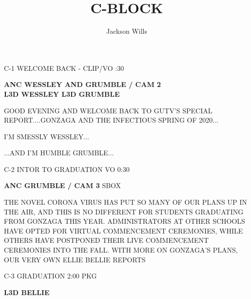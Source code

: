 \documentclass{article}
\title{C-BLOCK}
\author{Jackson Wills}
\newenvironment{changemargin}[2]{%
\begin{list}{}{%
\setlength{\topsep}{0pt}%
\setlength{\leftmargin}{#1}%
\setlength{\rightmargin}{#2}%
\setlength{\listparindent}{\parindent}%
\setlength{\itemindent}{\parindent}%
\setlength{\parsep}{\parskip}%
}%
\item[]}{\end{list}}
\begin{document}
\maketitle
\begin{flushleft}
\begin{changemargin}{-3cm}{-5cm}
\color{red}
C-1     WELCOME BACK - CLIP/VO  :30
\vspace{5mm}

\color{black}
\textbf{
ANC WESSLEY AND GRUMBLE / CAM 2} \\

\textbf{
L3D WESSLEY L3D GRUMBLE
}
\end{changemargin}

\begin{changemargin}{4cm}{1cm}
GOOD EVENING AND WELCOME BACK TO GUTV'S SPECIAL REPORT....GONZAGA AND THE INFECTIOUS SPRING OF 2020...

\vspace{5mm}

I'M SMESSLY WESSLEY...

\vspace{5mm}

...AND I'M HUMBLE GRUMBLE...
\end{changemargin}




\begin{changemargin}{-3cm}{-5cm}
\color{red}
C-2     INTOR TO GRADUATION  VO  0:30

\color{black}

\textbf{
ANC GRUMBLE / CAM 3}
\color{red}
SBOX
\end{changemargin}

\color{black}
\begin{changemargin}{4cm}{1cm}
THE NOVEL CORONA VIRUS HAS PUT SO MANY OF OUR PLANS UP IN THE AIR, AND THIS IS NO DIFFERENT FOR STUDENTS GRADUATING FROM GONZAGA THIS YEAR. ADMINISTRATORS AT OTHER SCHOOLS HAVE OPTED FOR VIRTUAL COMMENCEMENT CEREMONIES, WHILE OTHERS HAVE POSTPONED THEIR LIVE COMMENCEMENT CEREMONIES INTO THE FALL. WITH MORE ON GONZAGA'S PLANS, OUR VERY OWN ELLIE BELLIE REPORTS

\end{changemargin}

\begin{changemargin}{-3cm}{-5cm}
\color{red}
C-3     GRADUATION  2:00     PKG

\color{black}
\textbf{
L3D BELLIE
}


\end{changemargin}
\end{flushleft}
\end{document}
